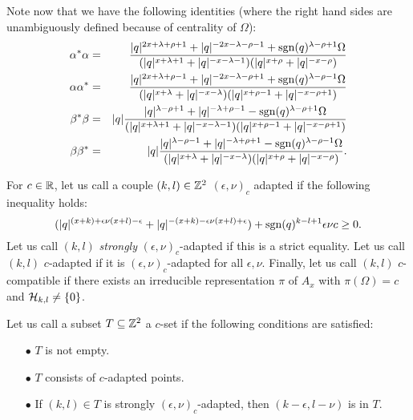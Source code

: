 Note now that we have the following identities (where the right hand sides are unambiguously defined because of centrality of $\Omega$): 
\begin{eqnarray*}
\alpha^*\alpha &=& \frac{|q|^{2x+\lambda+\rho+1}+|q|^{-2x-\lambda-\rho-1}+\operatorname{\mathrm{sgn}}(q)^{\lambda-\rho+1}\Omega}{(|q|^{x+\lambda+1}+|q|^{-x-\lambda-1})(|q|^{x+\rho}+|q|^{-x-\rho})}\\
\alpha\alpha^* &=& \frac{|q|^{2x+\lambda+\rho-1}+|q|^{-2x-\lambda-\rho+1}+\operatorname{\mathrm{sgn}}(q)^{\lambda-\rho-1}\Omega}{(|q|^{x+\lambda}+|q|^{-x-\lambda})(|q|^{x+\rho-1}+|q|^{-x-\rho+1})}\\
\beta^*\beta &=& |q|\frac{|q|^{\lambda-\rho+1}+|q|^{-\lambda+\rho-1}-\operatorname{\mathrm{sgn}}(q)^{\lambda-\rho+1}\Omega}{(|q|^{x+\lambda+1}+|q|^{-x-\lambda-1})(|q|^{x+\rho-1}+|q|^{-x-\rho+1})}\\
\beta\beta^* &=&  |q|\frac{|q|^{\lambda-\rho-1}+|q|^{-\lambda+\rho+1}-\operatorname{\mathrm{sgn}}(q)^{\lambda-\rho-1}\Omega}{(|q|^{x+\lambda}+|q|^{-x-\lambda})(|q|^{x+\rho}+|q|^{-x-\rho})}.
\end{eqnarray*}

For $c\in\mathbb{R}$, let us call a couple $(k,l)\in \mathbb{Z}^2$ $(\epsilon,\nu)_c$ adapted if the following inequality holds: \begin{equation}\label{EqAd}(|q|^{(x+k)+\epsilon\nu(x+l)-\epsilon}+|q|^{-(x+k)-\epsilon\nu(x+l)+\epsilon})+\operatorname{\mathrm{sgn}}(q)^{k-l+1}\epsilon\nu c\geq 0.\end{equation} Let us call $(k,l)$ \emph{strongly} $(\epsilon,\nu)_c$-adapted if this is a strict equality. Let us call $(k,l)$ $c$-adapted if it is $(\epsilon,\nu)_c$-adapted for all $\epsilon,\nu$. Finally, let us call $(k,l)$ $c$-compatible if there exists an irreducible representation $\pi$ of $A_x$ with $\pi(\Omega) = c$ and $\mathcal{H}_{k,l}\neq \{0\}$. 

Let us call a subset $T\subseteq \mathbb{Z}^2$ a $c$-set if the following conditions are satisfied: 
\begin{itemize} 
\item[$\bullet$] $T$ is not empty.
\item[$\bullet$] $T$ consists of $c$-adapted points.
\item[$\bullet$] If $(k,l)\in T$ is strongly $(\epsilon,\nu)_c$-adapted, then $(k-\epsilon,l-\nu)$ is in $T$.
\end{itemize}

